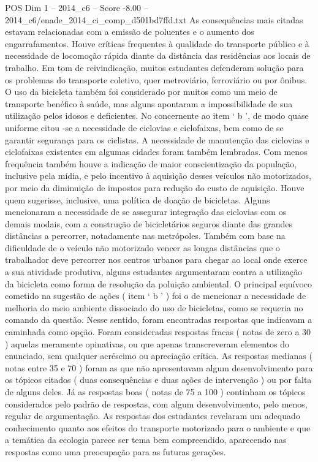 \begin{textsample}{POS Dim 1 – 2014\_c6 – Score -8.00 – 2014\_c6/enade\_2014\_ci\_comp\_d501bd7ffd.txt}
As consequências mais citadas estavam relacionadas com a emissão de poluentes e o aumento dos engarrafamentos.
Houve críticas frequentes à qualidade do transporte público e à necessidade de locomoção rápida diante da distância das residências aos locais de trabalho.
Em tom de reivindicação, muitos estudantes defenderam solução para os problemas do transporte coletivo, quer metroviário, ferroviário ou por ônibus.
O uso da bicicleta também foi considerado por muitos como um meio de transporte benéfico à saúde, mas alguns apontaram a impossibilidade de sua utilização pelos idosos e deficientes.
No concernente ao item ‘ b ’, de modo quase uniforme citou -se a necessidade de ciclovias e ciclofaixas, bem como de se garantir segurança para os ciclistas.
A necessidade de manutenção das ciclovias e ciclofaixas existentes em algumas cidades foram também lembradas.
Com menos frequência também houve a indicação de maior conscientização da população, inclusive pela mídia, e pelo incentivo à aquisição desses veículos não motorizados, por meio da diminuição de impostos para redução do custo de aquisição.
Houve quem sugerisse, inclusive, uma política de doação de bicicletas.
Alguns mencionaram a necessidade de se assegurar integração das ciclovias com os demais modais, com a construção de bicicletários seguros diante das grandes distâncias a percorrer, notadamente nas metrópoles.
Também com base na dificuldade de o veículo não motorizado vencer as longas distâncias que o trabalhador deve percorrer nos centros urbanos para chegar ao local onde exerce a sua atividade produtiva, alguns estudantes argumentaram contra a utilização da bicicleta como forma de resolução da poluição ambiental.
O principal equívoco cometido na sugestão de ações ( item ‘ b ’ ) foi o de mencionar a necessidade de melhoria do meio ambiente dissociado do uso de bicicletas, como se requeria no comando da questão.
Nesse sentido, foram encontradas respostas que indicavam a caminhada como opção.
Foram consideradas respostas fracas ( notas de zero a 30 ) aquelas meramente opinativas, ou que apenas transcreveram elementos do enunciado, sem qualquer acréscimo ou apreciação crítica.
As respostas medianas ( notas entre 35 e 70 ) foram as que não apresentavam algum desenvolvimento para os tópicos citados ( duas consequências e duas ações de intervenção ) ou por falta de alguns deles.
Já as respostas boas ( notas de 75 a 100 ) continham os tópicos considerados pelo padrão de respostas, com algum desenvolvimento, pelo menos, regular de argumentação.
As respostas dos estudantes revelaram um adequado conhecimento quanto aos efeitos do transporte motorizado para o ambiente e que a temática da ecologia parece ser tema bem compreendido, aparecendo nas respostas como uma preocupação para as futuras gerações.

\end{textsample}
